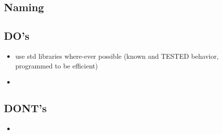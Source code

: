 \subsection{Naming}
\subsection{DO's}
\begin{itemize}
	\item use std libraries where-ever possible (known and TESTED behavior, programmed to be efficient)
	\item 
\end{itemize}

\subsection{DONT's}

\begin{itemize}
	\item 
\end{itemize}